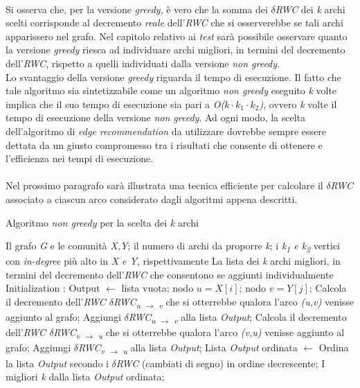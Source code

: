 \\Si osserva che, per la versione \textit{greedy}, è vero che la somma dei \textit{$\delta$RWC} dei \textit{k} archi scelti corrisponde al decremento \textit{reale} dell'\textit{RWC} che si osserverebbe se tali archi apparissero nel grafo. Nel capitolo relativo ai \textit{test} sarà possibile osservare quanto la versione \textit{greedy} riesca ad individuare archi migliori, in termini del decremento dell'\textit{RWC}, rispetto a quelli individuati dalla versione \textit{non greedy}.
\\Lo svantaggio della versione \textit{greedy} riguarda il tempo di esecuzione. Il fatto che tale algoritmo sia sintetizzabile come un algoritmo \textit{non greedy} eseguito \textit{k} volte implica che il suo tempo di esecuzione sia pari a \textit{O($k \cdot k_1 \cdot k_2$)}, ovvero \textit{k} volte il tempo di esecuzione della versione \textit{non greedy}. Ad ogni modo, la scelta dell'algoritmo di \textit{edge recommendation} da utilizzare dovrebbe sempre essere dettata da un giusto compromesso tra i risultati che consente di ottenere e l'efficienza nei tempi di esecuzione.
\\\\
Nel prossimo paragrafo sarà illustrata una tecnica efficiente per calcolare il \textit{$\delta$RWC} associato a ciascun arco considerato dagli algoritmi appena descritti.
\begin{algorithm}
\caption{Algoritmo \textit{non greedy} per la scelta dei \textit{k} archi}
\begin{algorithmic} 
\REQUIRE Il grafo \textit{G} e le comunità \textit{X,Y}; il numero di archi da proporre \textit{k}; i \textit{k\textsubscript{1} e k\textsubscript{2}} vertici con \textit{in-degree} più alto in \textit{X e Y}, rispettivamente 
\ENSURE La lista dei \textit{k} archi migliori, in termini del decremento dell'\textit{RWC} che consentono se aggiunti individualmente
\STATE Initialization : Output $\leftarrow$ lista vuota;
\STATE nodo $u = X[i]$;
\STATE nodo $v = Y[j]$;
\STATE Calcola il decremento dell'\textit{RWC $\delta$RWC\textsubscript{u $\rightarrow$ v}} che si otterrebbe qualora l'arco \textit{(u,v)} venisse aggiunto al grafo;
\STATE Aggiungi \textit{$\delta$RWC\textsubscript{u $\rightarrow$ v}} alla lista \textit{Output};
\STATE Calcola il decremento dell'\textit{RWC $\delta$RWC\textsubscript{v $\rightarrow$ u}} che si otterrebbe qualora l'arco \textit{(v,u)} venisse aggiunto al grafo;
\STATE Aggiungi \textit{$\delta$RWC\textsubscript{v $\rightarrow$ u}} alla lista \textit{Output};
\ENDFOR
\ENDFOR
\STATE Lista \textit{Output} ordinata $\leftarrow$ Ordina la lista \textit{Output} secondo i \textit{$\delta$RWC} (cambiati di segno) in ordine decrescente;
\RETURN I migliori \textit{k} dalla lista \textit{Output} ordinata;
\end{algorithmic}
\end{algorithm}

